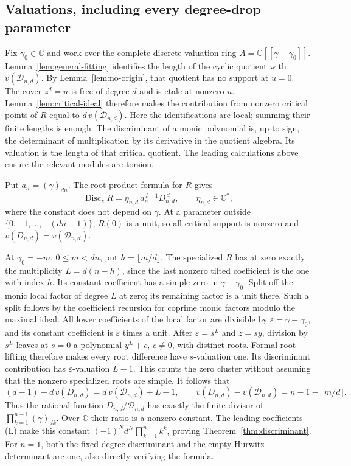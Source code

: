 \documentclass[11pt]{article}
\begin{document}
\subsection*{Valuations, including every degree-drop parameter}
Fix $\gamma_0\in\mathbb C$ and work over the complete discrete
valuation ring $A=\mathbb C[[\gamma-\gamma_0]]$.
Lemma~\ref{lem:general-fitting} identifies the length of the cyclic
quotient with $v(\mathcal D_{n,d})$.
By Lemma~\ref{lem:no-origin}, that quotient has no support at $u=0$.
The cover $z^d=u$ is free of degree $d$ and is etale at nonzero $u$.
Lemma~\ref{lem:critical-ideal} therefore makes the contribution from
nonzero critical points of $R$ equal to
$d\,v(\mathcal D_{n,d})$.
Here the identifications are local; summing their finite lengths
is enough. The discriminant of a monic polynomial is, up to sign,
the determinant of multiplication by its derivative in the quotient
algebra. Its valuation is the length of that critical quotient.
The leading calculations above ensure the relevant modules are torsion.

Put $a_n=(\gamma)_{dn}$.
The root product formula for $R$ gives
\[
 \operatorname{Disc}_zR
       =\eta_{n,d}\,a_n^{d-1}D_{n,d}^{\,d},\qquad
           \eta_{n,d}\in\mathbb C^*,
\]
where the constant does not depend on $\gamma$.
At a parameter outside $\{0,-1,\ldots,-(dn-1)\}$,
$R(0)$ is a unit, so all critical support is nonzero and
$v(D_{n,d})=v(\mathcal D_{n,d})$.

At $\gamma_0=-m$, $0\le m<dn$, put $h=\lfloor m/d\rfloor$.
The specialized $R$ has at zero exactly the multiplicity
$L=d(n-h)$, since the last nonzero tilted coefficient is the one
with index $h$. Its constant coefficient has a simple zero in
$\gamma-\gamma_0$.
Split off the monic local factor of degree $L$ at zero; its remaining
factor is a unit there. Such a split follows by the coefficient
recursion for coprime monic factors modulo the maximal ideal.
All lower coefficients of the local factor are divisible by
$\varepsilon=\gamma-\gamma_0$, and its constant coefficient is
$\varepsilon$ times a unit.
After $\varepsilon=s^L$ and $z=sy$, division by $s^L$ leaves at
$s=0$ a polynomial $y^L+c$, $c\ne0$, with distinct roots.
Formal root lifting therefore makes every root difference have
$s$-valuation one. Its discriminant contribution has
$\varepsilon$-valuation $L-1$.
This counts the zero cluster without assuming that the nonzero
specialized roots are simple.
It follows that
\[
 (d-1)+d\,v(D_{n,d})=d\,v(\mathcal D_{n,d})+L-1,
 \qquad
 v(D_{n,d})-v(\mathcal D_{n,d})=n-1-\lfloor m/d\rfloor.
\]
Thus the rational function $D_{n,d}/\mathcal D_{n,d}$ has exactly
the finite divisor of
$\prod_{k=1}^{n-1}(\gamma)_{dk}$.
Over $\mathbb C$ their ratio is a nonzero constant.
The leading coefficients (L) make this constant
$(-1)^Nd^N\prod_{k=1}^nk^k$, proving Theorem~\ref{thm:discriminant}.
For $n=1$, both the fixed-degree discriminant and the empty
Hurwitz determinant are one, also directly verifying the formula.
\end{document}
